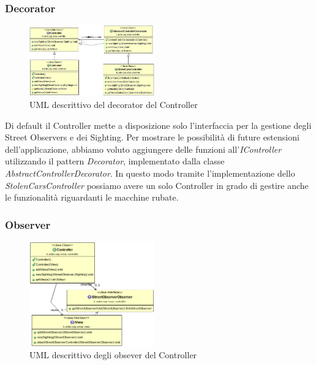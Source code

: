 \documentclass[a4paper,12pt]{report}
\begin{document}
    \subsubsection{Decorator}
      \begin{figure}
	\vspace{-40pt}
	\begin{center}
  \includegraphics[width=0.48\textwidth]{images/UMLcontroller}
	\caption{UML descrittivo del decorator del Controller}
	\label{fig:UMLcontrollerDecorator}
	\end{center}
	\vspace{-20pt}
      \end{figure}
      Di default il Controller mette a disposizione solo l'interfaccia per la 
    gestione degli Street Observers e dei Sighting.\newline
      Per mostrare le possibilità di future estensioni dell'applicazione, 
abbiamo voluto aggiungere delle funzioni all'\textit{IController} utilizzando 
il pattern \textit{Decorator}, implementato dalla classe     
\textit{AbstractControllerDecorator}. 
    In questo modo tramite l'implementazione dello 
\textit{StolenCarsController} possiamo avere un solo Controller in grado di 
gestire anche le funzionalità riguardanti le macchine rubate.

    
    \subsubsection{Observer}
    \begin{figure}
      \vspace{-40pt}
      \begin{center}
\includegraphics[width=0.48\textwidth]{images/UMLcontrollerObserver}
	\caption{UML descrittivo degli obsever del Controller}
	\label{fig:UMLcontrolerObserver}
      \end{center}
      \vspace{-10pt}
    \end{figure}
      
\end{document}
